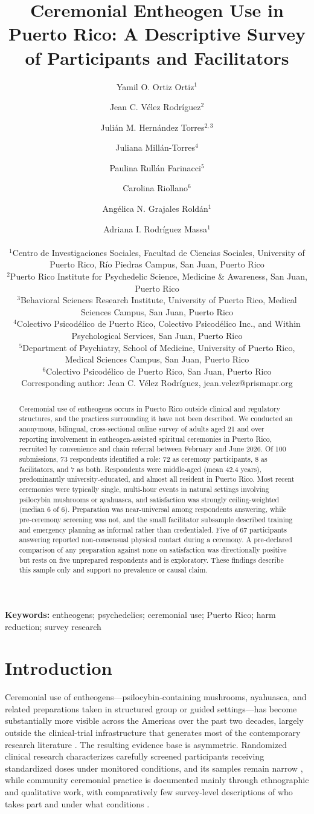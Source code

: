 \documentclass[12pt]{article}
\title{Ceremonial Entheogen Use in Puerto Rico: A Descriptive Survey of Participants and Facilitators}
\author{
  Yamil O. Ortiz Ortiz$^{1}$ \and Jean C. V\'elez Rodr\'iguez$^{2}$ \and Juli\'an M. Hern\'andez Torres$^{2,3}$ \and
  Juliana Mill\'an-Torres$^{4}$ \and Paulina Rull\'an Farinacci$^{5}$ \and Carolina Riollano$^{6}$ \and
  Ang\'elica N. Grajales Rold\'an$^{1}$ \and Adriana I. Rodr\'iguez Massa$^{1}$ \\[1em]
  \begin{minipage}{0.92\textwidth}\centering\small\setstretch{1.15}
  $^{1}$Centro de Investigaciones Sociales, Facultad de Ciencias Sociales, University of Puerto Rico,
  R\'io Piedras Campus, San Juan, Puerto Rico \\
  $^{2}$Puerto Rico Institute for Psychedelic Science, Medicine \& Awareness, San Juan, Puerto Rico \\
  $^{3}$Behavioral Sciences Research Institute, University of Puerto Rico, Medical Sciences Campus,
  San Juan, Puerto Rico \\
  $^{4}$Colectivo Psicod\'elico de Puerto Rico, Colectivo Psicod\'elico Inc., and Within Psychological
  Services, San Juan, Puerto Rico \\
  $^{5}$Department of Psychiatry, School of Medicine, University of Puerto Rico, Medical Sciences Campus,
  San Juan, Puerto Rico \\
  $^{6}$Colectivo Psicod\'elico de Puerto Rico, San Juan, Puerto Rico \\[0.5em]
  Corresponding author: Jean C. V\'elez Rodr\'iguez, jean.velez@prismapr.org
  \end{minipage}
}
\date{}
\begin{document}
\maketitle
\linenumbers

\begin{abstract}
\noindent
Ceremonial use of entheogens occurs in Puerto Rico outside clinical and regulatory structures, and the
practices surrounding it have not been described. We conducted an anonymous, bilingual, cross-sectional
online survey of adults aged 21 and over reporting involvement in entheogen-assisted spiritual ceremonies
in Puerto Rico, recruited by convenience and chain referral between February and June 2026. Of 100
submissions, 73 respondents identified a role: 72 as ceremony participants, 8 as facilitators, and 7 as
both. Respondents were middle-aged (mean 42.4 years), predominantly university-educated, and almost all
resident in Puerto Rico. Most recent ceremonies were typically single, multi-hour events in natural
settings involving psilocybin mushrooms or ayahuasca, and satisfaction was strongly ceiling-weighted
(median 6 of 6). Preparation was near-universal among respondents answering, while pre-ceremony screening
was not, and the small facilitator subsample described training and emergency planning as informal rather
than credentialed. Five of 67 participants answering reported non-consensual physical contact during a
ceremony. A pre-declared comparison of any preparation against none on satisfaction was directionally
positive but rests on five unprepared respondents and is exploratory. These findings describe this sample
only and support no prevalence or causal claim.
\end{abstract}

\noindent\textbf{Keywords:} entheogens; psychedelics; ceremonial use; Puerto Rico; harm reduction; survey research

\section{Introduction}

Ceremonial use of entheogens---psilocybin-containing mushrooms, ayahuasca, and related preparations taken
in structured group or guided settings---has become substantially more visible across the Americas over the
past two decades, largely outside the clinical-trial infrastructure that generates most of the contemporary
research literature \citep{golden2022effects,carvalho2025scoping}. The resulting evidence base is
asymmetric. Randomized clinical research characterizes carefully screened participants receiving
standardized doses under monitored conditions, and its samples remain narrow
\citep{hughes2024ethnoracial,marcus2026psychedelics}, while community ceremonial practice is documented
mainly through ethnographic and qualitative work, with comparatively few survey-level descriptions of who
takes part and under what conditions \citep{carvalho2025scoping}.
\end{document}

